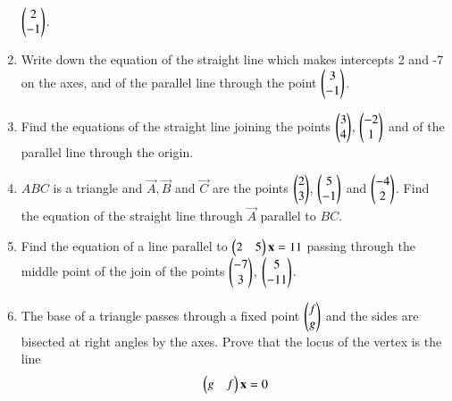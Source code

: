 \begin{enumerate}[label=\arabic*.,ref=\thesubsection.\theenumi]
$\begin{pmatrix}2\\-1\end{pmatrix}$.
\item Write down the equation of the straight line which makes intercepts 2 and -7 on the axes, and of the parallel line through
the point $\begin{pmatrix}3\\-1\end{pmatrix}$.
\item Find the equations of the straight line joining the points $\begin{pmatrix}3\\4\end{pmatrix}$, $\begin{pmatrix}-2\\1\end{pmatrix}$ and of the parallel line through
the origin.
\item $ABC$ is a triangle and $\vec{A}, \vec{B}$ and $\vec{C}$ are the points $\begin{pmatrix}2\\3\end{pmatrix}$, $\begin{pmatrix}5\\-1\end{pmatrix}$ and $\begin{pmatrix}-4\\2\end{pmatrix}$.  Find the equation
of the straight line through $\vec{A}$ parallel to $BC$.
\item Find the equation of a line parallel to $\begin{pmatrix}2 & 5\end{pmatrix}\mathbf{x}=11$ passing through the middle point of the join of the points $\begin{pmatrix}-7\\3\end{pmatrix}$, $\begin{pmatrix}5\\-11\end{pmatrix}$.
\\
\solution

\item The base of a triangle passes through a fixed point $\begin{pmatrix}f\\g\end{pmatrix}$ and the sides are bisected at right angles by the axes.  Prove that the locus
of the vertex is the line
\begin{equation}
\begin{pmatrix}g & f\end{pmatrix}\mathbf{x} = 0
\end{equation}
\end{enumerate}
